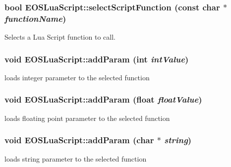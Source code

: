 \hypertarget{classEOSLuaScript_7f00ff555be32da27000d51bc7ba420f}{
\subsubsection[{selectScriptFunction}]{\setlength{\rightskip}{0pt plus 5cm}bool EOSLuaScript::selectScriptFunction (const char $\ast$ {\em functionName})}}
\label{classEOSLuaScript_7f00ff555be32da27000d51bc7ba420f}


Selects a Lua Script function to call. 

\hypertarget{classEOSLuaScript_a939a1d1daa1326a012e5e60e1b45f95}{
\subsubsection[{addParam}]{\setlength{\rightskip}{0pt plus 5cm}void EOSLuaScript::addParam (int {\em intValue})}}
\label{classEOSLuaScript_a939a1d1daa1326a012e5e60e1b45f95}


loads integer parameter to the selected function 

\hypertarget{classEOSLuaScript_1a6ac1c2783c000b1cf57b3a09c04cfc}{
\subsubsection[{addParam}]{\setlength{\rightskip}{0pt plus 5cm}void EOSLuaScript::addParam (float {\em floatValue})}}
\label{classEOSLuaScript_1a6ac1c2783c000b1cf57b3a09c04cfc}


loads floating point parameter to the selected function 

\hypertarget{classEOSLuaScript_9a6e58cbb890391a8eb34cf22a0e7cfd}{
\subsubsection[{addParam}]{\setlength{\rightskip}{0pt plus 5cm}void EOSLuaScript::addParam (char $\ast$ {\em string})}}
\label{classEOSLuaScript_9a6e58cbb890391a8eb34cf22a0e7cfd}


loads string parameter to the selected function 

